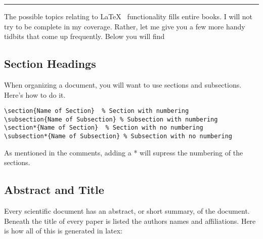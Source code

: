 \noindent\rule{5 in}{0.01 in}

The possible topics relating to \LaTeX~ functionality fills entire
books.  I will not try to be complete in my coverage.  Rather, let me
give you a few more handy tidbits that come up frequently.  Below you
will find 

\subsection*{Section Headings}
When organizing a document, you will want to use sections and
subsections. Here's how to do it.
\begin{Verbatim}
\section{Name of Section}  % Section with numbering
\subsection{Name of Subsection} % Subsection with numbering
\section*{Name of Section}  % Section with no numbering
\subsection*{Name of Subsection} % Subsection with no numbering

\end{Verbatim}

As mentioned in the comments, adding a * will supress the numbering
of the sections.
\pagebreak
\subsection*{Abstract and Title}
Every scientific document has an abstract, or short summary, of the
document.  Beneath the title of every paper is listed the authors
names and affiliations.  Here is how all of this is generated in
latex: 

